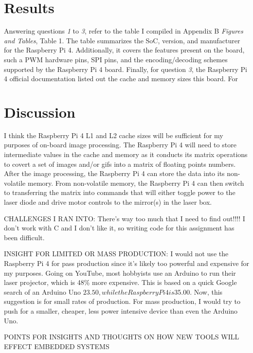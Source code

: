 \documentclass[journal]{IEEEtran}
\begin{document}
    \section{Results}
    Answering questions \emph{1} to \emph{3}, refer to the table I compiled in Appendix B \emph{Figures and Tables}, Table 1. 
    The table summarizes the SoC, version, and manufacturer for the Raspberry Pi 4.
    Additionally, it covers the features present on the board, such a PWM hardware pins, SPI pins, and the encoding/decoding schemes supported by the Raspberry Pi 4 board.
    Finally, for question \emph{3}, the Raspberry Pi 4 official documentation listed out the cache and memory sizes this board.
    For 
    \section{Discussion}
    I think the Raspberry Pi 4 L1 and L2 cache sizes will be sufficient for my purposes of on-board image processing. 
    The Raspberry Pi 4 will need to store intermediate values in the cache and memory as it conducts its matrix operations to covert a set of images and/or gifs into a matrix of floating points numbers.
    After the image processing, the Raspberry Pi 4 can store the data into its non-volatile memory.
    From non-volatile memory, the Raspberry Pi 4 can then switch to transferring the matrix into commands that will either toggle power to the laser diode and drive motor controls to the mirror(s) in the laser box. 

    CHALLENGES I RAN INTO: There's way too much that I need to find out!!!! I don't work with C and I don't like it, so writing code for this assignment has been difficult.

    INSIGHT FOR LIMITED OR MASS PRODUCTION: \newline
    I would not use the Raspberry Pi 4 for pass production since it's likely too powerful and expensive for my purposes. 
    Going on YouTube, most hobbyists use an Arduino to run their laser projector, which is 48\% more expensive. 
    This is based on a quick Google search of an Arduino Uno $23.50, while the Raspberry Pi 4 is $35.00. 
    Now, this suggestion is for small rates of production. For mass production, I would try to push for a smaller, cheaper, less power intensive device than even the Arduino Uno.

    POINTS FOR INSIGHTS AND THOUGHTS ON HOW NEW TOOLS WILL EFFECT EMBEDDED SYSTEMS
\end{document}
